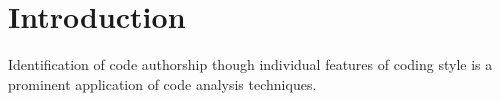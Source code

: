 \section{Introduction}
Identification of code authorship though individual features of coding style is a prominent application of code analysis techniques. \cite{caliskan2015anonymizing}